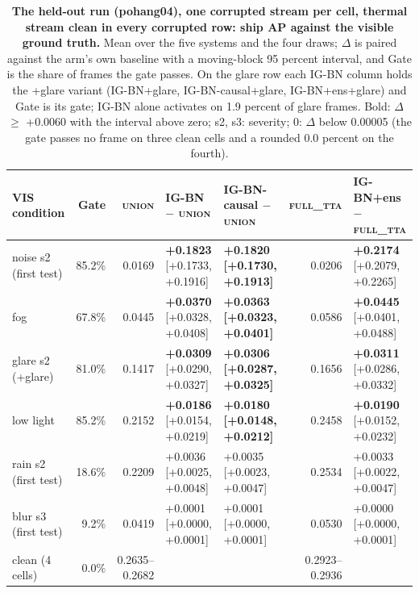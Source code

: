 \documentclass[10pt]{article}
\begin{document}
\begin{table}[htbp]
\centering
\footnotesize
\caption{\textbf{The held-out run (pohang04), one corrupted stream per cell, thermal stream clean in every corrupted row: ship AP against the visible ground truth.} Mean over the five systems and the four draws; $\Delta$ is paired against the arm's own baseline with a moving-block 95 percent interval, and Gate is the share of frames the gate passes. On the glare row each IG-BN column holds the +glare variant (IG-BN+glare, IG-BN-causal+glare, IG-BN+ens+glare) and Gate is its gate; IG-BN alone activates on 1.9 percent of glare frames. Bold: $\Delta$ $\geq$ +0.0060 with the interval above zero; s2, s3: severity; 0: $\Delta$ below 0.00005 (the gate passes no frame on three clean cells and a rounded 0.0 percent on the fourth).}
\label{tab:3}
\setlength{\tabcolsep}{3pt}
\begin{tabularx}{\linewidth}{lrr>{\raggedright\arraybackslash}X>{\raggedright\arraybackslash}Xr>{\raggedright\arraybackslash}X}
\toprule
VIS condition & Gate & \textsc{union} & IG-BN $-$ \textsc{union} & IG-BN-causal $-$ \textsc{union} & \textsc{full\_tta} & IG-BN+ens $-$ \textsc{full\_tta} \\
\midrule
noise s2 (first test) & 85.2\% & 0.0169 & \textbf{+0.1823} [+0.1733, +0.1916] & \textbf{+0.1820 [+0.1730, +0.1913]} & 0.0206 & \textbf{+0.2174} [+0.2079, +0.2265] \\
fog & 67.8\% & 0.0445 & \textbf{+0.0370} [+0.0328, +0.0408] & \textbf{+0.0363 [+0.0323, +0.0401]} & 0.0586 & \textbf{+0.0445} [+0.0401, +0.0488] \\
glare s2 (+glare) & 81.0\% & 0.1417 & \textbf{+0.0309} [+0.0290, +0.0327] & \textbf{+0.0306 [+0.0287, +0.0325]} & 0.1656 & \textbf{+0.0311} [+0.0286, +0.0332] \\
low light & 85.2\% & 0.2152 & \textbf{+0.0186} [+0.0154, +0.0219] & \textbf{+0.0180 [+0.0148, +0.0212]} & 0.2458 & \textbf{+0.0190} [+0.0152, +0.0232] \\
rain s2 (first test) & 18.6\% & 0.2209 & +0.0036 [+0.0025, +0.0048] & +0.0035 [+0.0023, +0.0047] & 0.2534 & +0.0033 [+0.0022, +0.0047] \\
blur s3 (first test) & 9.2\% & 0.0419 & +0.0001 [+0.0000, +0.0001] & +0.0001 [+0.0000, +0.0001] & 0.0530 & +0.0000 [+0.0000, +0.0001] \\
clean (4 cells) & 0.0\% & 0.2635--0.2682 & 0 & 0 & 0.2923--0.2936 & 0 \\
\bottomrule
\end{tabularx}
\end{table}
\end{document}
